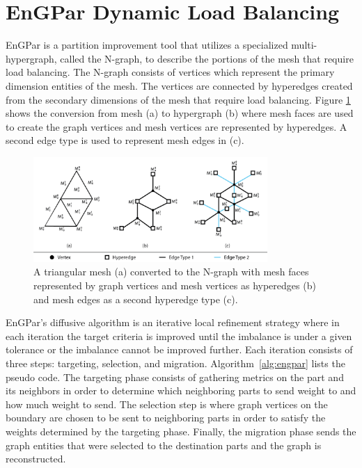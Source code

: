 \documentclass[graybox]{svmult}
\begin{document}
\section{EnGPar Dynamic Load Balancing} \label{sec:engpar}


EnGPar is a partition improvement tool that utilizes a specialized multi-hypergraph,
called the N-graph, to describe the portions of the mesh that require load balancing.
The N-graph consists of vertices which represent the primary dimension entities of the
mesh. The vertices are connected by hyperedges created from the secondary dimensions of
the mesh that require load balancing. Figure \ref{fig:ngraph} shows the conversion from
mesh (a) to hypergraph (b) where mesh faces are used to create the graph vertices and
mesh vertices are represented by hyperedges. A second edge type is used to represent mesh edges in (c). 

\begin{figure}[!ht]
  \centering
  \includegraphics[width=3.5in]{images/exampleMesh2Graph.png}
  \caption{A triangular mesh (a) converted to the N-graph with mesh faces represented by graph vertices and mesh vertices as hyperedges (b) and mesh edges as a second hyperedge type (c).}
  \label{fig:ngraph}
\end{figure}

EnGPar's diffusive algorithm is an iterative local refinement strategy where in each
iteration the target criteria is improved until the imbalance is under a given
tolerance or the imbalance cannot be improved further. Each iteration consists of three
steps: targeting, selection, and migration.
Algorithm~\ref{alg:engpar} lists the pseudo code.
The targeting phase consists of gathering
metrics on the part and its neighbors in order to determine which neighboring parts to
send weight to and how much weight to send. The selection step is where graph vertices
on the boundary are chosen to be sent to neighboring parts in order to satisfy the
weights determined by the targeting phase. Finally, the migration phase sends the graph
entities that were selected to the destination parts and the graph is reconstructed.
\end{document}
